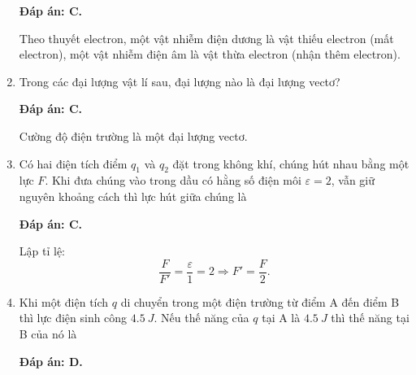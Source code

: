 \begin{enumerate}[label=\bfseries Câu \arabic*:]
{	}
	\loigiai
	{	\textbf{Đáp án: C.}
		
		Theo thuyết electron, một vật nhiễm điện dương là vật thiếu electron (mất electron), một vật nhiễm điện âm là vật thừa electron (nhận thêm electron).
	}
	\item {}
	
	\cauhoi
	{Trong các đại lượng vật lí sau, đại lượng nào là đại lượng vectơ?
		
	}
	\loigiai
	{	\textbf{Đáp án: C.}
		
		Cường độ điện trường là một đại lượng vectơ.
	}
	\item {}
	
	\cauhoi
	{Có hai điện tích điểm $q_1$ và $q_2$ đặt trong không khí, chúng hút nhau bằng một lực $F$. Khi đưa chúng vào trong dầu có hằng số điện môi $\varepsilon = 2$, vẫn giữ nguyên khoảng cách thì lực hút giữa chúng là
		
	}
	\loigiai
	{	\textbf{Đáp án: C.}
		
		Lập tỉ lệ:
		$$\dfrac{F}{F'} = \dfrac{\varepsilon}{1} = 2 \Rightarrow F'=\dfrac{F}{2}.$$
	}
	\item {}
	
	\cauhoi
	{Khi một điện tích $q$ di chuyển trong một điện trường từ điểm A đến điểm B thì lực điện sinh công $\SI{4.5}{J}$. Nếu thế năng của $q$ tại A là $\SI{4.5}{J}$ thì thế năng tại B của nó là
		
	}
	\loigiai
	{	\textbf{Đáp án: D.}
		
}
\end{enumerate}
